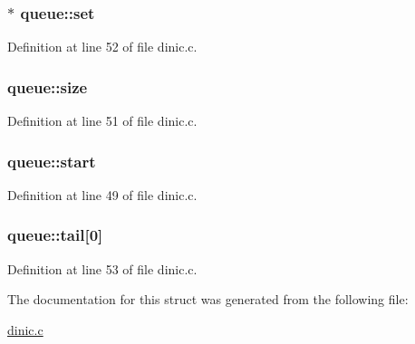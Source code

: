\hypertarget{structqueue_a7dfaf91cd2f512796f794c42eb9a8005}{
\subsubsection[{set}]{$\ast$ {\bf queue::set}}}
\label{structqueue_a7dfaf91cd2f512796f794c42eb9a8005}


Definition at line 52 of file dinic.c.

\hypertarget{structqueue_a3da3651335989ee987013cf401fe95f7}{
\subsubsection[{size}]{ {\bf queue::size}}}
\label{structqueue_a3da3651335989ee987013cf401fe95f7}


Definition at line 51 of file dinic.c.

\hypertarget{structqueue_a0f850ad75a962c21fea47ea4668d22d3}{
\subsubsection[{start}]{ {\bf queue::start}}}
\label{structqueue_a0f850ad75a962c21fea47ea4668d22d3}


Definition at line 49 of file dinic.c.

\hypertarget{structqueue_a2d8e2d86310561ed10242d25c8d91213}{
\subsubsection[{tail}]{ {\bf queue::tail}\mbox{[}0\mbox{]}}}
\label{structqueue_a2d8e2d86310561ed10242d25c8d91213}


Definition at line 53 of file dinic.c.



The documentation for this struct was generated from the following file:\begin{DoxyCompactItemize}
\item 
\hyperlink{dinic_8c}{dinic.c}\end{DoxyCompactItemize}
